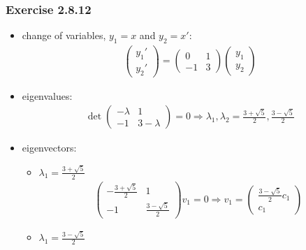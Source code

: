 \documentclass[12pt, letterpaper]{scrartcl}
\begin{document}
\subsubsection*{Exercise 2.8.12}
\begin{itemize}
    \item change of variables, $y_1=x$ and $y_2=x'$:
    \begin{align*}
        \left(\begin{array}{c}
        y_1' \\
        y_2' 
        \end{array}\right)=
        \left(\begin{array}{cc}
        0 & 1 \\
        -1 & 3 
        \end{array}\right)
        \left(\begin{array}{c}
        y_1 \\
        y_2 
        \end{array}\right)
    \end{align*}
    \item eigenvalues:
    \begin{align*}
        \det 
        \left(\begin{array}{cc}
        -\lambda & 1 \\
        -1 & 3-\lambda 
        \end{array}\right)=0
        \Longrightarrow
        \lambda_{1},\lambda_{2}=\frac{3+\sqrt{5}}{2}, \frac{3-\sqrt{5}}{2}
    \end{align*}
    \item eigenvectors:
    \begin{itemize}
        \item $\lambda_{1}=\frac{3+\sqrt{5}}{2}$
        \begin{align*}
            \left(\begin{array}{cc}
            -\frac{3+\sqrt{5}}{2} & 1 \\
            -1 & \frac{3-\sqrt{5}}{2} 
            \end{array}\right)
            v_1=0
            \Longrightarrow
            v_1=\left(\begin{array}{c}
            \frac{3-\sqrt{5}}{2}c_1 \\
             c_1
            \end{array}\right)
        \end{align*}
        \item $\lambda_{1}=\frac{3-\sqrt{5}}{2}$
        \begin{align*}

\end{align*}
\end{itemize}
\end{itemize}
\end{document}
